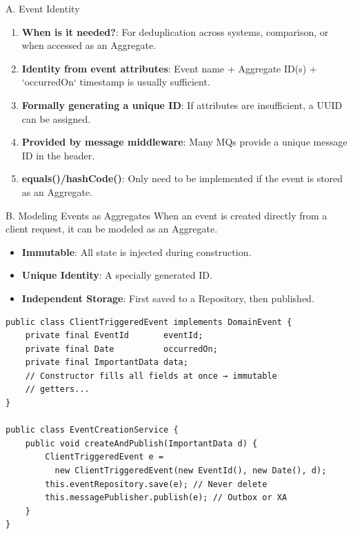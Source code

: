 \documentclass{beamer}
\begin{document}
\begin{frame}{A. Event Identity}
  \begin{enumerate}
    \item \textbf{When is it needed?}: For deduplication across systems, comparison, or when accessed as an Aggregate.
    \item \textbf{Identity from event attributes}: Event name + Aggregate ID(s) + `occurredOn` timestamp is usually sufficient.
    \item \textbf{Formally generating a unique ID}: If attributes are insufficient, a UUID can be assigned.
    \item \textbf{Provided by message middleware}: Many MQs provide a unique message ID in the header.
    \item \textbf{equals()/hashCode()}: Only need to be implemented if the event is stored as an Aggregate.
  \end{enumerate}
\end{frame}

\begin{frame}[fragile]{B. Modeling Events as Aggregates}
  When an event is created directly from a client request, it can be modeled as an Aggregate.
  \begin{itemize}
    \item \textbf{Immutable}: All state is injected during construction.
    \item \textbf{Unique Identity}: A specially generated ID.
    \item \textbf{Independent Storage}: First saved to a Repository, then published.
  \end{itemize}
  \lstset{language=Java, basicstyle=\ttfamily\tiny}
  \begin{lstlisting}
public class ClientTriggeredEvent implements DomainEvent {
    private final EventId       eventId;
    private final Date          occurredOn;
    private final ImportantData data;
    // Constructor fills all fields at once → immutable
    // getters...
}

public class EventCreationService {
    public void createAndPublish(ImportantData d) {
        ClientTriggeredEvent e =
          new ClientTriggeredEvent(new EventId(), new Date(), d);
        this.eventRepository.save(e); // Never delete
        this.messagePublisher.publish(e); // Outbox or XA
    }
}
  \end{lstlisting}
\end{frame}
\end{document}

